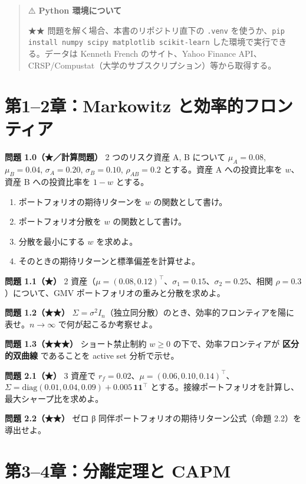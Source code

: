 \documentclass[11pt,a4paper]{report}
\begin{document}
\begin{quote}
⚠️ \textbf{Python 環境について}

★★ 問題を解く場合、本書のリポジトリ直下の \texttt{.venv} を使うか、\texttt{pip install numpy scipy matplotlib scikit-learn} した環境で実行できる。データは Kenneth French のサイト、Yahoo Finance API、CRSP/Compustat（大学のサブスクリプション）等から取得する。
\end{quote}

\section{第1–2章：Markowitz と効率的フロンティア}

\textbf{問題 1.0（★／計算問題）} 2 つのリスク資産 A, B について $\mu_A = 0.08$, $\mu_B = 0.04$, $\sigma_A = 0.20$, $\sigma_B = 0.10$, $\rho_{AB} = 0.2$ とする。資産 A への投資比率を $w$、資産 B への投資比率を $1 - w$ とする。

\begin{enumerate}
\item ポートフォリオの期待リターンを $w$ の関数として書け。
\item ポートフォリオ分散を $w$ の関数として書け。
\item 分散を最小にする $w$ を求めよ。
\item そのときの期待リターンと標準偏差を計算せよ。
\end{enumerate}

\textbf{問題 1.1（★）} 2 資産（$\mu = (0.08, 0.12)^\top$、$\sigma_1 = 0.15$、$\sigma_2 = 0.25$、相関 $\rho = 0.3$）について、GMV ポートフォリオの重みと分散を求めよ。

\textbf{問題 1.2（★★）} $\Sigma = \sigma^2 I_n$（独立同分散）のとき、効率的フロンティアを陽に表せ。$n \to \infty$ で何が起こるか考察せよ。

\textbf{問題 1.3（★★★）} ショート禁止制約 $w \ge 0$ の下で、効率フロンティアが \textbf{区分的双曲線} であることを active set 分析で示せ。

\textbf{問題 2.1（★）} 3 資産で $r_f = 0.02$、$\mu = (0.06, 0.10, 0.14)^\top$、$\Sigma = \mathrm{diag}(0.01, 0.04, 0.09) + 0.005\, \mathbf{1}\mathbf{1}^\top$ とする。接線ポートフォリオを計算し、最大シャープ比を求めよ。

\textbf{問題 2.2（★★）} ゼロ β 同伴ポートフォリオの期待リターン公式（命題 2.2）を導出せよ。

\section{第3–4章：分離定理と CAPM}
\end{document}
